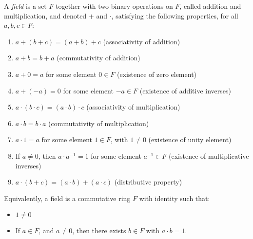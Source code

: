 \documentclass[12pt]{article}
\begin{document}
A \emph{field} is a set $F$ together with two binary operations on $F$, called addition and multiplication, and denoted $+$ and $\cdot$, satisfying the following properties, for all $a,b,c \in F$:

\begin{enumerate}
\item $a + (b+c) = (a+b)+ c$ (associativity of addition)
\item $a+b = b+a$ (commutativity of addition)
\item $a+0 = a$ for some element $0 \in F$ (existence of zero element)
\item $a+(-a) = 0$ for some element $-a \in F$ (existence of additive inverses)
\item $a\cdot (b\cdot c) = (a\cdot b)\cdot c$ (associativity of multiplication)
\item $a\cdot b = b\cdot a$ (commutativity of multiplication)
\item $a\cdot 1 = a$ for some element $1 \in F$, with $1 \neq 0$ (existence of unity element)
\item If $a \neq 0$, then $a \cdot a^{-1} = 1$ for some element $a^{-1} \in F$ (existence of multiplicative inverses)
\item $a\cdot (b+c) = (a\cdot b) + (a\cdot c)$ (distributive property)
\end{enumerate}

Equivalently, a field is a commutative ring $F$ with identity such that:
\begin{itemize}
\item $1 \neq 0$
\item If $a \in F$, and $a \neq 0$, then there exists $b \in F$ with $a \cdot b = 1$.
\end{itemize}

\end{document}
